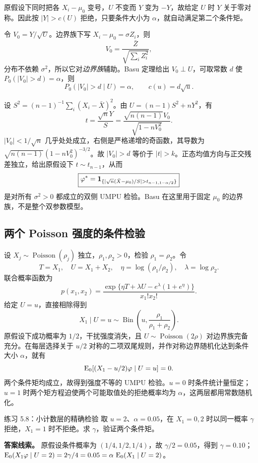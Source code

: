 原假设下同时把各 $X_i-\mu_0$ 变号，$U$ 不变而 $Y$ 变为 $-Y$，故给定 $U$ 时 $Y$ 关于零对称。因此按 $|Y|>c(U)$ 拒绝，只要条件大小为 $\alpha$，就自动满足第二个条件矩。

令 $V_0=Y/\sqrt U$。边界族下写 $X_i-\mu_0=\sigma Z_i$，则
\[
 V_0=\frac{\bar Z}{\sqrt{\sum_i Z_i^2}},
\]
分布不依赖 $\sigma^2$，所以它对\emph{边界族}辅助。Basu 定理给出 $V_0\perp U$，可取常数 $d$ 使 $P_0(|V_0|>d)=\alpha$，则
\[
 P_0(|V_0|>d\mid U)=\alpha,
 \qquad c(u)=d\sqrt u.
\]

设 $S^2=(n-1)^{-1}\sum_i(X_i-\bar X)^2$。由 $U=(n-1)S^2+nY^2$，有
\[
 t=\frac{\sqrt nY}{S}
 =\frac{\sqrt{n(n-1)}V_0}{\sqrt{1-nV_0^2}}.
\]
$|V_0|<1/\sqrt n$ 几乎处处成立，右侧是严格递增的奇函数，其导数为
$\sqrt{n(n-1)}(1-nV_0^2)^{-3/2}$。故 $|V_0|>d$ 等价于 $|t|>k$。正态均值方向与正交残差独立，给出原假设下 $t\sim t_{n-1}$，从而
\[
 \boxed{\varphi^*=
 \ind_{\{|\sqrt n(\bar X-\mu_0)/S|>t_{n-1,1-\alpha/2}\}}}
\]
是对所有 $\sigma^2>0$ 都成立的双侧 UMPU 检验。Basu 在这里用于固定 $\mu_0$ 的边界族，不是整个双参数模型。

\subsection{两个 Poisson 强度的条件检验}

设 $X_j\sim\operatorname{Poisson}(\rho_j)$ 独立，$\rho_1,\rho_2>0$，检验 $\rho_1=\rho_2$。令
\[
 T=X_1,\quad U=X_1+X_2,\quad
 \eta=\log(\rho_1/\rho_2),\quad\lambda=\log\rho_2.
\]
联合概率函数为
\[
 p(x_1,x_2)=\frac{\exp\{\eta T+\lambda U-e^\lambda(1+e^\eta)\}}
 {x_1!x_2!}.
\]
给定 $U=u$，直接相除得到
\[
 X_1\mid U=u\sim\operatorname{Bin}\left(u,
               \frac{\rho_1}{\rho_1+\rho_2}\right).
\]
原假设下成功概率为 $1/2$，干扰强度消失，且 $U\sim\operatorname{Poisson}(2\rho)$ 对边界族完备充分。在每层选择关于 $u/2$ 对称的二项双尾规则，并作对称边界随机化达到条件大小 $\alpha$，就有
\[
 \operatorname{E}_0[(X_1-u/2)\varphi\mid U=u]=0.
\]
两个条件矩均成立，故得到强度不等的 UMPU 检验。$u=0$ 时条件统计量恒定；$u=1$ 时两个矩方程迫使两个可能取值处的拒绝概率均为 $\alpha$，这两层都用常数随机化。

\begin{examplebox}{练习 5.8：小计数层的精确检验}
取 $u=2$、$\alpha=0.05$，在 $X_1=0,2$ 时以同一概率 $\gamma$ 拒绝，$X_1=1$ 时不拒绝。求 $\gamma$，验证两个条件矩。

\textbf{答案线索。} 原假设条件概率为 $(1/4,1/2,1/4)$，故 $\gamma/2=0.05$，得到 $\gamma=0.10$；$\operatorname{E}_0(X_1\varphi\mid U=2)=2\gamma/4=0.05=\alpha\,\operatorname{E}_0(X_1\mid U=2)$。
\end{examplebox}

